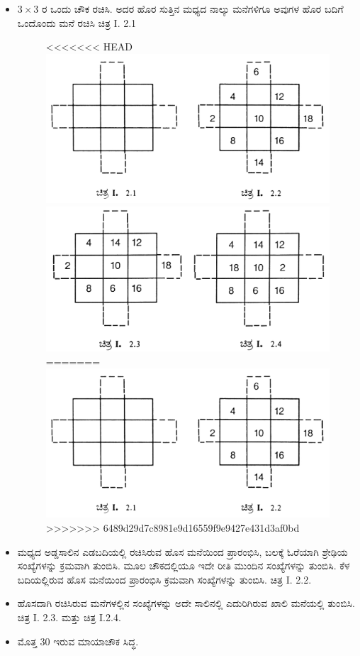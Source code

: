 \begin{itemize}
	\item $3 \times 3$ ರ ಒಂದು ಚೌಕ ರಚಿಸಿ. ಅದರ ಹೊರ ಸುತ್ತಿನ ಮಧ್ಯದ ನಾಲ್ಕು ಮನೆಗಳಿಗೂ ಅವುಗಳ ಹೊರ ಬದಿಗೆ ಒಂದೊಂದು ಮನೆ ರಚಿಸಿ ಚಿತ್ರ I. 2.1
	\begin{figure}[h]
<<<<<<< HEAD
	\includegraphics{src/figures/chap3/fig3-3.jpg}\\
	\includegraphics{src/figures/chap3/fig3-4.jpg}
=======
	\includegraphics[scale=.9]{src/figures/chap3/fig3.3.jpg}
>>>>>>> 6489d29d7c8981e9d16559f9e9427e431d3af0bd
	\end{figure}
	\item ಮಧ್ಯದ ಅಡ್ಡಸಾಲಿನ ಎಡಬದಿಯಲ್ಲಿ ರಚಿಸಿರುವ ಹೊಸ ಮನೆಯಿಂದ ಪ್ರಾರಂಭಿಸಿ, ಬಲಕ್ಕೆ ಓರೆಯಾಗಿ ಶ್ರೇಢಿಯ ಸಂಖ್ಯೆಗಳನ್ನು ಕ್ರಮವಾಗಿ ತುಂಬಿಸಿ. ಮೂಲ ಚೌಕದಲ್ಲಿಯೂ ಇದೇ ರೀತಿ ಮುಂದಿನ ಸಂಖ್ಯೆಗಳನ್ನು ತುಂಬಿಸಿ. ಕೆಳ ಬದಿಯಲ್ಲಿರುವ ಹೊಸ ಮನೆಯಿಂದ ಪ್ರಾರಂಭಿಸಿ ಕ್ರಮವಾಗಿ ಸಂಖ್ಯೆಗಳನ್ನು ತುಂಬಿಸಿ. ಚಿತ್ರ I. 2.2.
	\item ಹೊಸದಾಗಿ ರಚಿಸಿರುವ ಮನೆಗಳಲ್ಲಿನ ಸಂಖ್ಯೆಗಳನ್ನು ಅದೇ ಸಾಲಿನಲ್ಲಿ ಎದುರಿಗಿರುವ ಖಾಲಿ ಮನೆಯಲ್ಲಿ ತುಂಬಿಸಿ. ಚಿತ್ರ I. 2.3. ಮತ್ತು ಚಿತ್ರ I.2.4.
	\item ಮೊತ್ತ 30 ಇರುವ ಮಾಯಾಚೌಕ ಸಿದ್ಧ.
\end{itemize}

